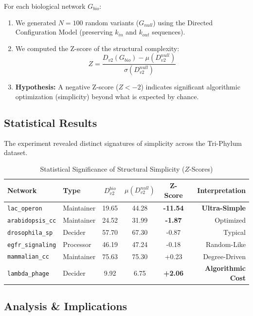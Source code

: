 For each biological network $G_{bio}$:
\begin{enumerate}
    \item We generated $N=100$ random variants ($G_{null}$) using the Directed Configuration Model (preserving $k_{in}$ and $k_{out}$ sequences).
    \item We computed the Z-score of the structural complexity:
    $$ Z = \frac{D_{v2}(G_{bio}) - \mu(D_{v2}^{null})}{\sigma(D_{v2}^{null})} $$
    \item \textbf{Hypothesis:} A negative Z-score ($Z < -2$) indicates significant algorithmic optimization (simplicity) beyond what is expected by chance.
\end{enumerate}

\subsection{Statistical Results}
The experiment revealed distinct signatures of simplicity across the Tri-Phylum dataset.

\begin{table}[H]
\centering
\caption{Statistical Significance of Structural Simplicity ($Z$-Scores)}
\label{tab:z_scores}
\begin{tabular}{@{}l l c c c r@{}}
\toprule
\textbf{Network} & \textbf{Type} & \textbf{$D_{v2}^{bio}$} & \textbf{$\mu(D_{v2}^{null})$} & \textbf{Z-Score} & \textbf{Interpretation} \\ \midrule
\texttt{lac\_operon} & Maintainer & 19.65 & 44.28 & \textbf{-11.54} & \textbf{Ultra-Simple} \\
\texttt{arabidopsis\_cc} & Maintainer & 24.52 & 31.99 & \textbf{-1.87} & Optimized \\
\texttt{drosophila\_sp} & Decider & 57.70 & 67.30 & -0.87 & Typical \\
\texttt{egfr\_signaling} & Processor & 46.19 & 47.24 & -0.18 & Random-Like \\
\texttt{mammalian\_cc} & Maintainer & 75.63 & 75.30 & +0.23 & Degree-Driven \\
\texttt{lambda\_phage} & Decider & 9.92 & 6.75 & \textbf{+2.06} & \textbf{Algorithmic Cost} \\
\bottomrule
\end{tabular}
\end{table}

\subsection{Analysis \& Implications}

